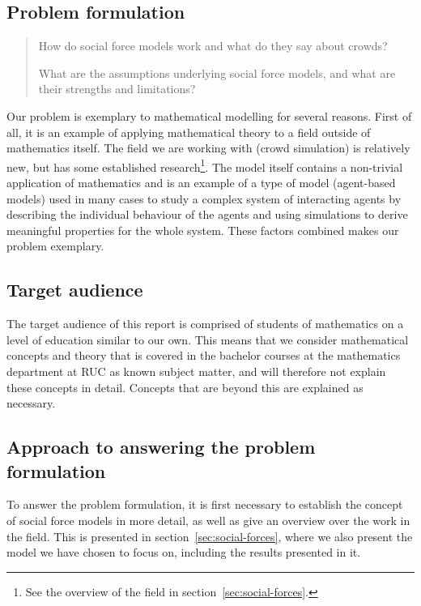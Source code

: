 \subsection{Problem formulation}
\begin{quote}
    How do social force models work and what do they say about crowds?

    What are the assumptions underlying social force models, and what are 
    their strengths and limitations?
\end{quote}

Our problem is exemplary to mathematical modelling for several reasons. First 
of all, it is an example of applying mathematical theory to a field outside of 
mathematics itself. The field we are working with (crowd simulation) is 
relatively new, but has some established research\footnote{See the overview of 
the field in section~\ref{sec:social-forces}.}. The model itself contains a 
non-trivial application of mathematics and is an example of a type of model 
(agent-based models) used in many cases to study a complex system of 
interacting agents by describing the individual behaviour of the agents and 
using simulations to derive meaningful properties for the whole system. These 
factors combined makes our problem exemplary.

\subsection{Target audience}
The target audience of this report is comprised of students of mathematics on 
a level of education similar to our own. This means that we consider 
mathematical concepts and theory that is covered in the bachelor courses at 
the mathematics department at RUC as known subject matter, and will therefore 
not explain these concepts in detail. Concepts that are beyond this are 
explained as necessary.

\subsection{Approach to answering the problem formulation}
To answer the problem formulation, it is first necessary to establish the 
concept of social force models in more detail, as well as give an overview 
over the work in the field. This is presented in 
section~\ref{sec:social-forces}, where we also present the model we have chosen 
to focus on, including the results presented in it.

